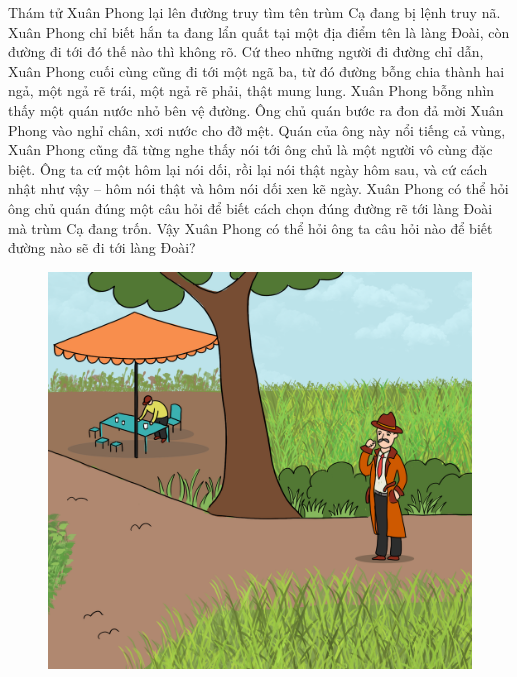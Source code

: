 \begin{multicols}{2}
	Thám tử Xuân Phong lại lên đường truy tìm tên trùm Cạ đang bị lệnh truy nã. Xuân Phong chỉ biết hắn ta đang lẩn quất tại một địa điểm tên là làng Đoài, còn đường đi tới đó thế nào thì không rõ. Cứ theo những người đi đường chỉ dẫn, Xuân Phong cuối cùng cũng đi tới một ngã ba, từ đó đường bỗng chia thành hai ngả, một ngả rẽ trái, một ngả rẽ phải, thật mung lung. Xuân Phong bỗng nhìn thấy một quán nước nhỏ bên vệ đường. Ông chủ quán bước ra đon đả mời Xuân Phong vào nghỉ chân, xơi nước cho đỡ mệt. Quán của ông này nổi tiếng cả vùng, Xuân Phong cũng đã từng nghe thấy nói tới ông chủ là một người vô cùng đặc biệt. Ông ta cứ một hôm lại nói dối, rồi lại nói thật ngày hôm sau, và cứ cách nhật như vậy -- hôm nói thật và hôm nói dối xen kẽ ngày. Xuân Phong có thể hỏi ông chủ quán đúng một câu hỏi để biết cách chọn đúng đường rẽ tới làng Đoài mà trùm Cạ đang trốn. Vậy Xuân Phong có thể hỏi ông ta câu hỏi nào để biết đường nào sẽ đi tới \linebreak làng Đoài?
\end{multicols}
	\begin{figure}[H]
	\vspace*{-5pt}
	\centering
	\captionsetup{labelformat= empty, justification=centering}
	\includegraphics[width= 1\linewidth]{xp2}
	\vspace*{-5pt}
\end{figure}
